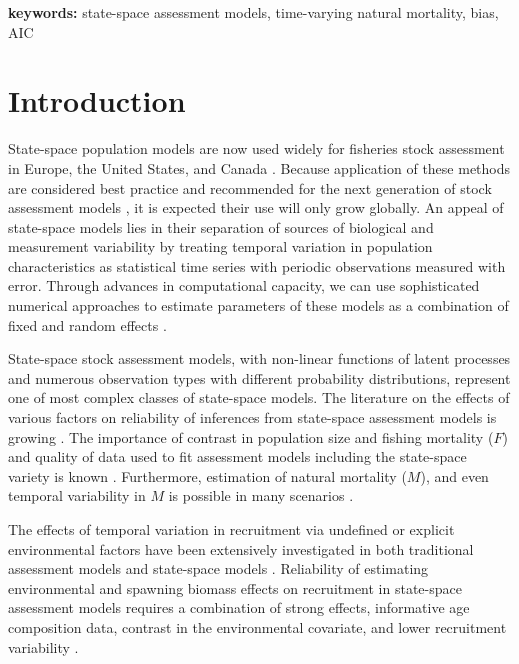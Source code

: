 \documentclass[
  12pt,
]{article}
\begin{document}
\textbf{keywords:} state-space assessment models, time-varying natural mortality, bias, AIC

\pagebreak

\section*{Introduction}\label{introduction}

State-space population models are now used widely for fisheries stock assessment in Europe, the United States, and Canada \citep{nielsenberg14, cadigan16, pedersenberg17, stockmiller21}. Because application of these methods are considered best practice and recommended for the next generation of stock assessment models \citep{hoyleetal22, punt23}, it is expected their use will only grow globally. An appeal of state-space models lies in their separation of sources of biological and measurement variability by treating temporal variation in population characteristics as statistical time series with periodic observations measured with error. Through advances in computational capacity, we can use sophisticated numerical approaches to estimate parameters of these models as a combination of fixed and random effects \citep{thorsonminto15, kristensenetal16}.

State-space stock assessment models, with non-linear functions of latent processes and numerous observation types with different probability distributions, represent one of most complex classes of state-space models. The literature on the effects of various factors on reliability of inferences from state-space assessment models is growing \citep{lietal24, milleretal_inreview1}. The importance of contrast in population size and fishing mortality (\(F\)) and quality of data used to fit assessment models including the state-space variety is known \citep{magnussonhilborn07, milleretal_inreview1}. Furthermore, estimation of natural mortality (\(M\)), and even temporal variability in \(M\) is possible in many scenarios \citep{leeetal11, cadigan16, millerhyun18, milleretal_inreview1}.

The effects of temporal variation in recruitment via undefined or explicit environmental factors have been extensively investigated in both traditional assessment models and state-space models \citep{myers98, haltuchpunt11, johnsonetal16, milleretal16}. Reliability of estimating environmental and spawning biomass effects on recruitment in state-space assessment models requires a combination of strong effects, informative age composition data, contrast in the environmental covariate, and lower recruitment variability \citep{brittenetal26, milleretal_inreview1}.
\end{document}
